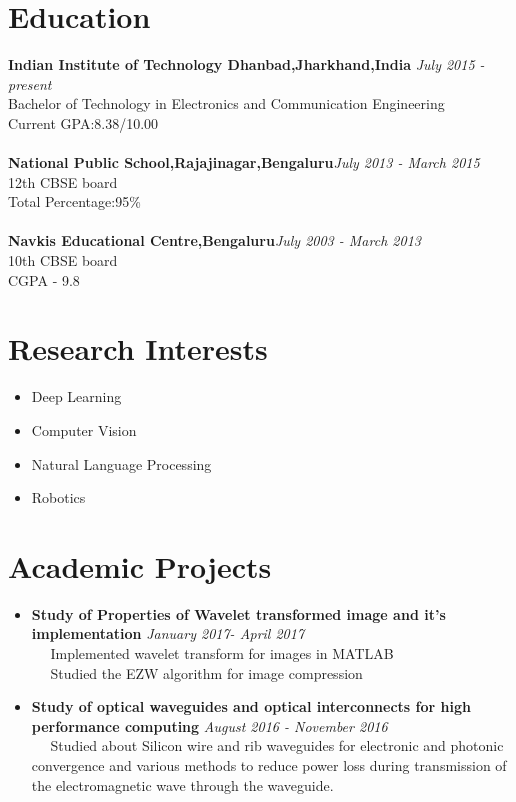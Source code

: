 \documentclass[margin, centered]{res}
\begin{document}
\begin{resume}

\section{\textbf{Education}}

\textbf{Indian Institute of Technology Dhanbad,Jharkhand,India} \hfill\textit{ July 2015 - present}\\
Bachelor of Technology in Electronics and Communication Engineering\\
Current GPA:8.38/10.00\\ \\
\textbf{National Public School,Rajajinagar,Bengaluru}\hfill\textit{July 2013 - March 2015}\\
12th CBSE board\\
Total Percentage:95\%\\ \\
\textbf{Navkis Educational Centre,Bengaluru}\hfill\textit{July 2003 - March 2013}\\
10th CBSE board\\
CGPA - 9.8\\

\section{\textbf{Research Interests}}
\begin{itemize}
\item Deep Learning
\item Computer Vision
\item Natural Language Processing
\item Robotics
\end{itemize}

\section{\textbf{Academic Projects}}
\begin{itemize}
\item \textbf{Study of Properties of Wavelet transformed image and it's implementation} \hfill\textit{January 2017- April 2017}\\
~\textbullet~ Implemented wavelet transform for images in MATLAB\\
~\textbullet~ Studied the EZW algorithm for image compression 

\item \textbf{Study of optical waveguides and optical interconnects for high performance computing} \hfill\textit{August 2016 - November 2016}\\
~\textbullet~ Studied about Silicon wire and rib waveguides for electronic and photonic convergence and various methods to reduce power loss during transmission of the electromagnetic wave through the waveguide.\\
\end{itemize}


\end{resume}
\end{document}
